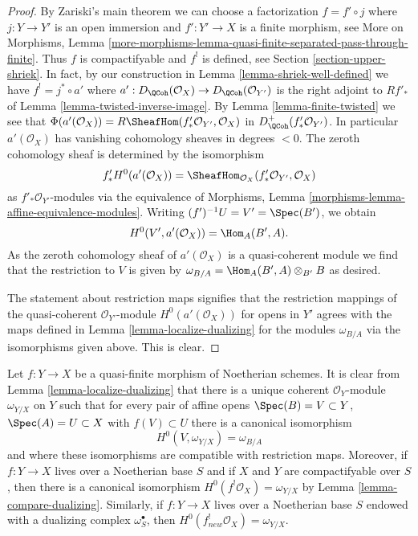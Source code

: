 \begin{proof}
By Zariski's main theorem we can choose a factorization $f = f' \circ j$
where $j : Y \to Y'$ is an open immersion and $f' : Y' \to X$ is a finite
morphism, see More on Morphisms, Lemma
\ref{more-morphisms-lemma-quasi-finite-separated-pass-through-finite}.
Thus $f$ is compactifyable and $f^!$ is defined, see
Section \ref{section-upper-shriek}. In fact, by our construction
in Lemma \ref{lemma-shriek-well-defined} we have
$f^! = j^* \circ a'$ where
$a' : D_\QCoh(\mathcal{O}_X) \to D_\QCoh(\mathcal{O}_{Y'})$
is the right adjoint to $Rf'_*$ of Lemma \ref{lemma-twisted-inverse-image}.
By Lemma \ref{lemma-finite-twisted}
we see that
$\Phi(a'(\mathcal{O}_X)) = R\SheafHom(f'_*\mathcal{O}_{Y'}, \mathcal{O}_X)$ in
$D_\QCoh^+(f'_*\mathcal{O}_{Y'})$. In particular $a'(\mathcal{O}_X)$ has
vanishing cohomology sheaves in degrees $< 0$. The zeroth cohomology sheaf
is determined by the isomorphism
$$
f'_*H^0(a'(\mathcal{O}_X)) =
\SheafHom_{\mathcal{O}_X}(f'_*\mathcal{O}_{Y'}, \mathcal{O}_X)
$$
as $f'_*\mathcal{O}_{Y'}$-modules via the equivalence of
Morphisms, Lemma \ref{morphisms-lemma-affine-equivalence-modules}.
Writing $(f')^{-1}U = V' = \Spec(B')$, we obtain
$$
H^0(V', a'(\mathcal{O}_X)) = \Hom_A(B', A).
$$
As the zeroth cohomology sheaf of $a'(\mathcal{O}_X)$
is a quasi-coherent module we find that
the restriction to $V$ is given by
$\omega_{B/A} = \Hom_A(B', A) \otimes_{B'} B$ as desired.

\medskip\noindent
The statement about restriction maps signifies that the restriction mappings
of the quasi-coherent $\mathcal{O}_{Y'}$-module $H^0(a'(\mathcal{O}_X))$
for opens in $Y'$ agrees with the maps defined in
Lemma \ref{lemma-localize-dualizing}
for the modules $\omega_{B/A}$ via the isomorphisms given above.
This is clear.
\end{proof}

\begin{remark}
\label{remark-relative-dualizing-for-quasi-finite}
Let $f : Y \to X$ be a quasi-finite morphism of Noetherian schemes. It
is clear from Lemma \ref{lemma-localize-dualizing}
that there is a unique coherent $\mathcal{O}_Y$-module
$\omega_{Y/X}$ on $Y$ such that for every pair of affine opens
$\Spec(B) = V \subset Y$, $\Spec(A) = U \subset X$ with $f(V) \subset U$
there is a canonical isomorphism
$$
H^0(V, \omega_{Y/X}) = \omega_{B/A}
$$
and where these isomorphisms are compatible with restriction maps.
Moreover, if $f : Y \to X$ lives over a Noetherian base $S$ and
if $X$ and $Y$ are compactifyable over $S$, then there is a canonical
isomorphism $H^0(f^!\mathcal{O}_X) = \omega_{Y/X}$ by
Lemma \ref{lemma-compare-dualizing}.
Similarly, if $f : Y \to X$ lives over a Noetherian base $S$
endowed with a dualizing complex $\omega_S^\bullet$, then
$H^0(f_{new}^!\mathcal{O}_X) = \omega_{Y/X}$.
\end{remark}







